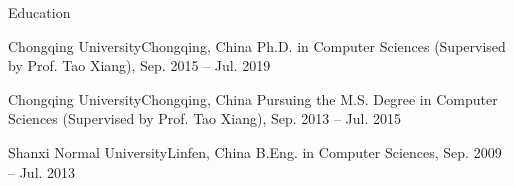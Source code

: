 \documentclass[]{mcdowellcv}
\newcommand{\graycolor}{\textcolor[rgb]{0.3,0.3,0.3}}
\begin{document}
	\begin{cvsection}{\Large Education}
		\begin{cvsubsection}{Chongqing University}{Chongqing, China}{}
			\graycolor{Ph.D. in Computer Sciences (Supervised by Prof. Tao Xiang), Sep. 2015 -- Jul. 2019}
		\end{cvsubsection}
		\begin{cvsubsection}{Chongqing University}{Chongqing, China}{}
			\graycolor{Pursuing the M.S. Degree in Computer Sciences (Supervised by Prof. Tao Xiang), Sep. 2013 -- Jul. 2015}
		\end{cvsubsection}
		\begin{cvsubsection}{Shanxi Normal University}{Linfen, China}{}
			\graycolor{B.Eng. in Computer Sciences, Sep. 2009 -- Jul. 2013}
		\end{cvsubsection}
	\end{cvsection}
	
\end{document}
